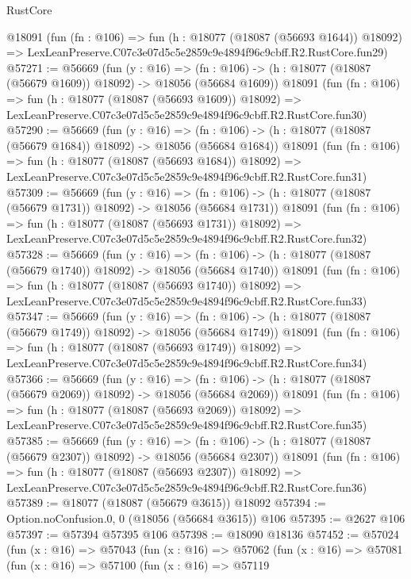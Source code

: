 \begin{lexlean}{RustCore}
\begin{coremodule}
    @18091
    (fun (fn : @106) =>
    fun (h : @18077 (@18087 (@56693 @1644)) @18092) =>
    LexLeanPreserve.C07c3e07d5c5e2859c9e4894f96c9cbff.R2.RustCore.fun29)
@57271 := @56669
    (fun (y : @16) =>
    (fn : @106) -> (h : @18077 (@18087 (@56679 @1609)) @18092) -> @18056 (@56684 @1609))
    @18091
    (fun (fn : @106) =>
    fun (h : @18077 (@18087 (@56693 @1609)) @18092) =>
    LexLeanPreserve.C07c3e07d5c5e2859c9e4894f96c9cbff.R2.RustCore.fun30)
@57290 := @56669
    (fun (y : @16) =>
    (fn : @106) -> (h : @18077 (@18087 (@56679 @1684)) @18092) -> @18056 (@56684 @1684))
    @18091
    (fun (fn : @106) =>
    fun (h : @18077 (@18087 (@56693 @1684)) @18092) =>
    LexLeanPreserve.C07c3e07d5c5e2859c9e4894f96c9cbff.R2.RustCore.fun31)
@57309 := @56669
    (fun (y : @16) =>
    (fn : @106) -> (h : @18077 (@18087 (@56679 @1731)) @18092) -> @18056 (@56684 @1731))
    @18091
    (fun (fn : @106) =>
    fun (h : @18077 (@18087 (@56693 @1731)) @18092) =>
    LexLeanPreserve.C07c3e07d5c5e2859c9e4894f96c9cbff.R2.RustCore.fun32)
@57328 := @56669
    (fun (y : @16) =>
    (fn : @106) -> (h : @18077 (@18087 (@56679 @1740)) @18092) -> @18056 (@56684 @1740))
    @18091
    (fun (fn : @106) =>
    fun (h : @18077 (@18087 (@56693 @1740)) @18092) =>
    LexLeanPreserve.C07c3e07d5c5e2859c9e4894f96c9cbff.R2.RustCore.fun33)
@57347 := @56669
    (fun (y : @16) =>
    (fn : @106) -> (h : @18077 (@18087 (@56679 @1749)) @18092) -> @18056 (@56684 @1749))
    @18091
    (fun (fn : @106) =>
    fun (h : @18077 (@18087 (@56693 @1749)) @18092) =>
    LexLeanPreserve.C07c3e07d5c5e2859c9e4894f96c9cbff.R2.RustCore.fun34)
@57366 := @56669
    (fun (y : @16) =>
    (fn : @106) -> (h : @18077 (@18087 (@56679 @2069)) @18092) -> @18056 (@56684 @2069))
    @18091
    (fun (fn : @106) =>
    fun (h : @18077 (@18087 (@56693 @2069)) @18092) =>
    LexLeanPreserve.C07c3e07d5c5e2859c9e4894f96c9cbff.R2.RustCore.fun35)
@57385 := @56669
    (fun (y : @16) =>
    (fn : @106) -> (h : @18077 (@18087 (@56679 @2307)) @18092) -> @18056 (@56684 @2307))
    @18091
    (fun (fn : @106) =>
    fun (h : @18077 (@18087 (@56693 @2307)) @18092) =>
    LexLeanPreserve.C07c3e07d5c5e2859c9e4894f96c9cbff.R2.RustCore.fun36)
@57389 := @18077 (@18087 (@56679 @3615)) @18092
@57394 := Option.noConfusion.{0, 0} (@18056 (@56684 @3615)) @106
@57395 := @2627 @106
@57397 := @57394 @57395 @106
@57398 := @18090 @18136
@57452 := @57024
    (fun (x : @16) =>
    @57043
      (fun (x : @16) =>
      @57062
        (fun (x : @16) =>
        @57081
          (fun (x : @16) =>
          @57100
            (fun (x : @16) =>
            @57119

\end{coremodule}
\end{lexlean}
